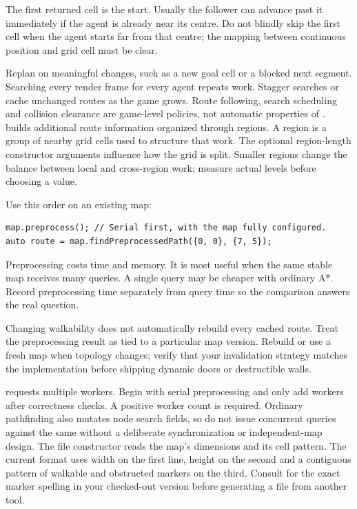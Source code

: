 \documentclass[11pt,a4paper]{article}
\begin{document}
The first returned cell is the start. Usually the follower can advance past it immediately if the agent is already near its centre. Do not blindly skip the first cell when the agent starts far from that centre; the mapping between continuous position and grid cell must be clear.

Replan on meaningful changes, such as a new goal cell or a blocked next segment. Searching every render frame for every agent repeats work. Stagger searches or cache unchanged routes as the game grows. Route following, search scheduling and collision clearance are game-level policies, not automatic properties of .
 builds additional route information organized through regions. A region is a group of nearby grid cells used to structure that work. The optional region-length constructor arguments influence how the grid is split. Smaller regions change the balance between local and cross-region work; measure actual levels before choosing a value.

Use this order on an existing map:\begin{lstlisting}
map.preprocess(); // Serial first, with the map fully configured.
auto route = map.findPreprocessedPath({0, 0}, {7, 5});
\end{lstlisting}
Preprocessing costs time and memory. It is most useful when the same stable map receives many queries. A single query may be cheaper with ordinary A*. Record preprocessing time separately from query time so the comparison answers the real question.

Changing walkability does not automatically rebuild every cached route. Treat the preprocessing result as tied to a particular map version. Rebuild or use a fresh map when topology changes; verify that your invalidation strategy matches the implementation before shipping dynamic doors or destructible walls.

 requests multiple workers. Begin with serial preprocessing and only add workers after correctness checks. A positive worker count is required. Ordinary pathfinding also mutates node search fields, so do not issue concurrent queries against the same  without a deliberate synchronization or independent-map design.
The file constructor reads the map's dimensions and its cell pattern. The current format uses width on the first line, height on the second and a contiguous pattern of walkable and obstructed markers on the third. Consult  for the exact marker spelling in your checked-out version before generating a file from another tool.
\end{document}
